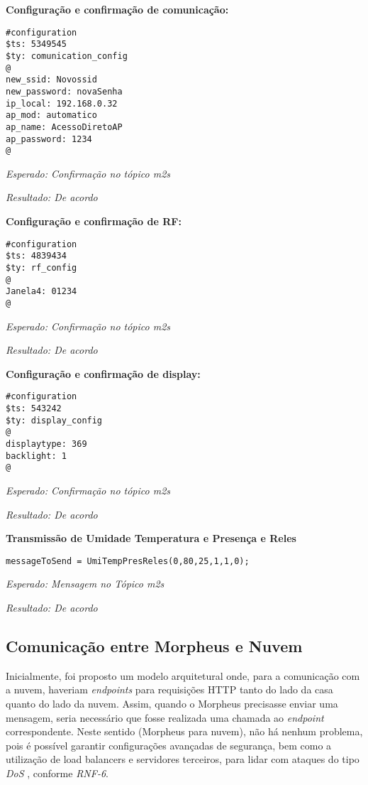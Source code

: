 \textbf{Configuração e confirmação de comunicação:}
\begin{lstlisting}
#configuration
$ts: 5349545
$ty: comunication_config
@
new_ssid: Novossid
new_password: novaSenha
ip_local: 192.168.0.32
ap_mod: automatico
ap_name: AcessoDiretoAP
ap_password: 1234
@
\end{lstlisting}

\emph{Esperado: Confirmação no tópico \wmqtt{} m2s}

\emph{Resultado: De acordo}

\textbf{Configuração e confirmação de RF:}
\begin{lstlisting}
#configuration
$ts: 4839434
$ty: rf_config
@
Janela4: 01234
@
\end{lstlisting}

\emph{Esperado: Confirmação no tópico \wmqtt{} m2s}

\emph{Resultado: De acordo}

\textbf{Configuração e confirmação de display:}
\begin{lstlisting}
#configuration
$ts: 543242
$ty: display_config
@
displaytype: 369
backlight: 1
@
\end{lstlisting}

\emph{Esperado: Confirmação no tópico \wmqtt{} m2s}

\emph{Resultado: De acordo}

\textbf{Transmissão de Umidade Temperatura e Presença e Reles}
\begin{lstlisting}
messageToSend = UmiTempPresReles(0,80,25,1,1,0);
\end{lstlisting}

\emph{Esperado: Mensagem no Tópico \wmqtt{} m2s}

\emph{Resultado: De acordo}


\subsection{Comunicação entre Morpheus e Nuvem}

Inicialmente, foi proposto um modelo arquitetural onde, para a comunicação com a nuvem, haveriam \emph{endpoints} para requisições HTTP tanto do lado da casa quanto do lado da nuvem. Assim, quando o Morpheus precisasse enviar uma mensagem, seria necessário que fosse realizada uma chamada ao \emph{endpoint} correspondente. Neste sentido (Morpheus para nuvem), não há nenhum problema, pois é possível garantir configurações avançadas de segurança, bem como a utilização de load balancers e servidores terceiros, para lidar com ataques do tipo \emph{DoS} \cite{akamai}, conforme \emph{RNF-6}.

